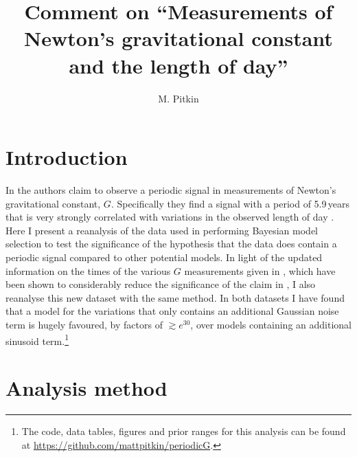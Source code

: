 \documentclass[doublecol]{epl2}
\title{Comment on ``Measurements of Newton's gravitational constant and the length of day''}
\author{M. Pitkin}
\institute{
  SUPA, School of Physics \& Astronomy, University of Glasgow, Glasgow, G12 8QQ, UK
}
\begin{document}
\maketitle

\section{Introduction}

In \cite{2015EL....11010002A} the authors claim to observe a periodic signal in measurements of
Newton's gravitational constant, $G$. Specifically they find a signal with a period of 5.9\,years that
is very strongly correlated with variations in the observed length of day
\cite{2013Natur.499..202H}. Here I present a reanalysis of the data used in \cite{2015EL....11010002A}
performing Bayesian model selection to test the significance of the hypothesis that the data does contain
a periodic signal compared to other potential models. In light of the updated information on the times
of the various $G$ measurements given in \cite{2015arXiv150501774S}, which have been shown to considerably
reduce the significance of the claim in \cite{2015EL....11010002A}, I also reanalyse this new dataset with
the same method. In both datasets I have found that a model for the variations that only contains an
additional Gaussian noise term is hugely favoured, by factors of $\gtrsim e^{30}$, over models containing
an additional sinusoid term.\footnote{The code, data tables, figures and prior ranges for this analysis can be
found at \url{https://github.com/mattpitkin/periodicG}.}

\section{Analysis method}
\end{document}
